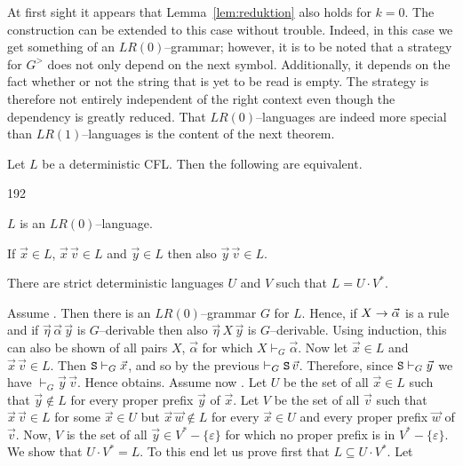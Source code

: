 At first sight it appears that Lemma~\ref{lem:reduktion}
also holds for $k = 0$. The construction can be extended to
this case without trouble. Indeed, in this case we get something
of an $LR(0)$--grammar; however, it is to be noted that
a strategy for $G^>$ does not only depend on the next symbol.
Additionally, it depends on the fact whether or not the string that
is yet to be read is empty. The strategy is therefore not
entirely independent of the right context even though
the dependency is greatly reduced. That $LR(0)$--languages
are indeed more special than $LR(1)$--languages is the
content of the next theorem.
\nocite{gellerharrison:lr0}
\begin{thm}
Let $L$ be a deterministic CFL. Then the following are equivalent.
\begin{dingautolist}{192}
\item
$L$ is an $LR(0)$--language.
\item
If $\vec{x} \in L$, $\vec{x}\,  \vec{v} \in L$ and $\vec{y} \in L$
then also $\vec{y}\, \vec{v} \in L$.
\item
There are strict deterministic languages $U$ and $V$ such that
$L = U \cdot V^{\ast}$.
\end{dingautolist}
\end{thm}
\proofbeg
Assume . Then there is an $LR(0)$--grammar $G$ for $L$. Hence, 
if $X \rightarrow \vec{\alpha}$ is a rule and if $\vec{\eta} \, \vec{\alpha} 
\, \vec{y}$ is $G$--derivable then also  $\vec{\eta}\, X \, \vec{y}$ is
$G$--derivable. Using induction, this can also be shown of
all pairs $X$, $\vec{\alpha}$ for which $X \vdash_G \vec{\alpha}$.
Now let $\vec{x} \in L$ and $\vec{x}\, \vec{v} \in L$. Then
$\mbox{\tt S} \vdash_G \vec{x}$, and so by the
previous $\vdash_G \mbox{\tt S} \, \vec{v}$. Therefore, 
since $\mbox{\tt S} \vdash_G \vec{y}$ we have 
$\vdash_G \vec{y}\, \vec{v}$. Hence  obtains.
Assume now . Let $U$ be the set of all $\vec{x} \in L$ 
such that $\vec{y} \not\in L$ for every proper prefix $\vec{y}$ of 
$\vec{x}$. Let $V$ be the set of all $\vec{v}$ such that $\vec{x}\,
\vec{v} \in L$ for some $\vec{x} \in U$ but
$\vec{x}\, \vec{w} \not\in L$ for every $\vec{x} \in U$
and every proper prefix $\vec{w}$ of $\vec{v}$.
Now, $V$ is the set of all $\vec{y} \in V^{\ast} -
\{\varepsilon\}$ for which no proper prefix is in $V^{\ast} -
\{\varepsilon\}$. We show that $U \cdot V^{\ast} = L$. To this end
let us prove first that $L \subseteq U \cdot V^{\ast}$. Let
